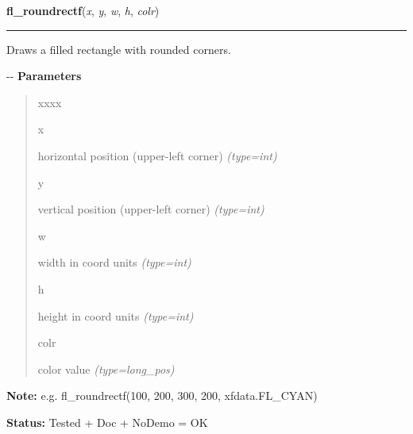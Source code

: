     \label{xformslib:flxbasic:fl_roundrectf}

    \vspace{0.5ex}

\hspace{.8\funcindent}\begin{boxedminipage}{\funcwidth}

    \raggedright \textbf{fl\_roundrectf}(\textit{x}, \textit{y}, \textit{w}, \textit{h}, \textit{colr})

    \vspace{-1.5ex}

    \rule{\textwidth}{0.5\fboxrule}
\setlength{\parskip}{2ex}

Draws a filled rectangle with rounded corners.

-{}-
\setlength{\parskip}{1ex}
      \textbf{Parameters}
      \vspace{-1ex}

      \begin{quote}
        \begin{Ventry}{xxxx}

          \item[x]


horizontal position (upper-left corner)
            {\it (type=int)}

          \item[y]


vertical position (upper-left corner)
            {\it (type=int)}

          \item[w]


width in coord units
            {\it (type=int)}

          \item[h]


height in coord units
            {\it (type=int)}

          \item[colr]


color value
            {\it (type=long\_pos)}

        \end{Ventry}

      \end{quote}

\textbf{Note:} 
e.g. fl\_roundrectf(100, 200, 300, 200, xfdata.FL\_CYAN)


\textbf{Status:} 
Tested + Doc + NoDemo = OK


    \end{boxedminipage}


